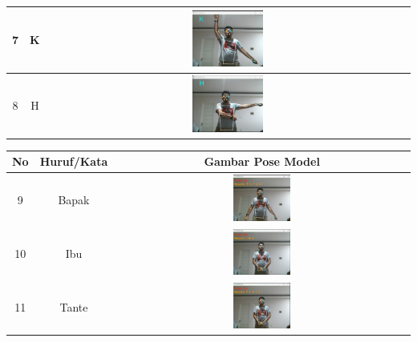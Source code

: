 \begin{table}[!hbt]
\begin{tabular}{|c|c|c|}
	\hline
	7 & K & \includegraphics[width=0.2\textwidth]{gambar/bener/HurufK_ModelCNN_Dawe.png} \\
	\hline
	8 & H & \includegraphics[width=0.2\textwidth]{gambar/bener/HurufH_ModelCNN_Dawe.png} \\
	\hline
	\end{tabular}
\end{table}

\begin{table}[!hbt]
	\centering
	\begin{tabular}{|c|c|c|}
		\hline
		No & Huruf/Kata & Gambar Pose Model  \\
		\hline
		9 & Bapak & \includegraphics[width=0.2\textwidth]{gambar/bener/HurufBapak_ModelCNN_Dawe.png} \\
		\hline
		10 & Ibu & \includegraphics[width=0.2\textwidth]{gambar/bener/HurufIbu_ModelCNN_Dawe.png} \\
		\hline
		11 & Tante & \includegraphics[width=0.2\textwidth]{gambar/bener/HurufTante_ModelCNN_Dawe.png} \\
		\hline
	\end{tabular}
\end{table}

